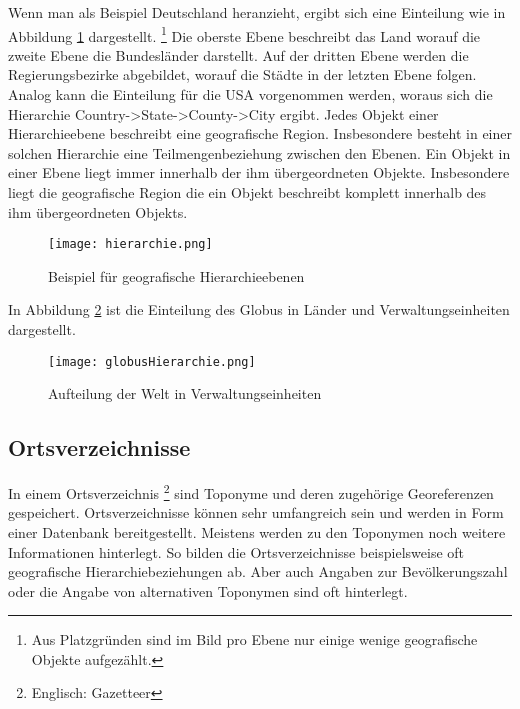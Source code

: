 			Wenn man als Beispiel Deutschland heranzieht, ergibt sich eine Einteilung wie in Abbildung \ref{img:hierarchy} dargestellt. \footnote{Aus Platzgründen sind im Bild pro Ebene nur einige wenige geografische Objekte aufgezählt.} 
			Die oberste Ebene beschreibt das Land worauf die zweite Ebene die Bundesländer darstellt.
			Auf der dritten Ebene werden die Regierungsbezirke abgebildet, worauf die Städte in der letzten Ebene folgen. 
			Analog kann die Einteilung für die USA vorgenommen werden, woraus sich die Hierarchie Country->State->County->City ergibt.
			Jedes Objekt einer Hierarchieebene beschreibt eine geografische Region. 
			Insbesondere besteht in einer solchen Hierarchie eine Teilmengenbeziehung zwischen den Ebenen. 
			Ein Objekt in einer Ebene liegt immer innerhalb der ihm übergeordneten Objekte.
			Insbesondere liegt die geografische Region die ein Objekt beschreibt komplett innerhalb des ihm übergeordneten Objekts.			

			\begin{figure}[h!]
			\begin{center}
			\texttt{[image: hierarchie.png]}
			\caption{Beispiel für geografische Hierarchieebenen}
			\label{img:hierarchy}
			\end{center}
			\end{figure}	

			In Abbildung \ref{img:globusHierarchie} ist die Einteilung des Globus in Länder und Verwaltungseinheiten dargestellt. 

			\begin{figure}[h!]
			\begin{center}
			\texttt{[image: globusHierarchie.png]}
			\caption{Aufteilung der Welt in Verwaltungseinheiten}
			\label{img:globusHierarchie}
			\end{center}
			\end{figure}	

		\subsection{Ortsverzeichnisse}

			In einem Ortsverzeichnis \footnote{Englisch: Gazetteer} sind Toponyme und deren zugehörige Georeferenzen gespeichert.
			Ortsverzeichnisse können sehr umfangreich sein und werden in Form einer Datenbank bereitgestellt.
			Meistens werden zu den Toponymen noch weitere Informationen hinterlegt.
			So bilden die Ortsverzeichnisse beispielsweise oft geografische Hierarchiebeziehungen ab.
			Aber auch Angaben zur Bevölkerungszahl oder die Angabe von alternativen Toponymen sind oft hinterlegt.

